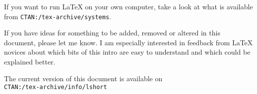 If you want to run \LaTeX{} on your own computer, take a look at what
is available from \texttt{CTAN:/tex-archive/systems}.

\noindent If you have ideas for something to be
added, removed or altered in this document, please let me know. I am
especially interested in feedback from \LaTeX{} novices about which
bits of this intro are easy to understand and which could be explained
better.

\bigskip
\begin{verse}
%
\end{verse}
\noindent The current version of this document is available on\\
\texttt{CTAN:/tex-archive/info/lshort}

\endinput



